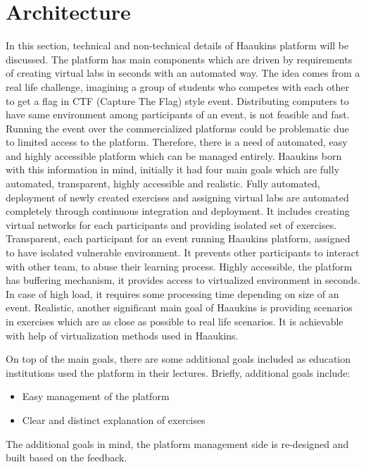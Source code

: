 \chapter{Architecture}\label{chapter:}

In this section, technical and non-technical details of Haaukins platform will be discussed. The platform has main components which are driven by requirements of creating virtual labs in seconds with an automated way.  The idea comes from a real life challenge, imagining a group of students who competes with each other to get a flag in CTF (Capture The Flag) style event. Distributing computers to have same environment among participants of an event, is not feasible and fast. Running the event over the commercialized platforms could be problematic due to limited access to the platform. Therefore, there is a need of automated, easy and highly accessible platform which can be managed entirely. Haaukins born with this information in mind, initially it had four main goals which are fully automated, transparent, highly accessible and realistic\cite{8820918}. 
Fully automated, deployment of newly created exercises and assigning virtual labs are automated completely through continuous integration and deployment. It includes creating virtual networks for each participants and providing isolated set of exercises. 
Transparent, each participant for an event running Haaukins platform, assigned to have isolated vulnerable environment. It prevents other participants to interact with other team, to abuse their learning process. 
Highly accessible, the platform has buffering mechanism, it provides access to virtualized environment in seconds. In case of high load, it requires some processing time depending on size of an event. 
Realistic, another significant main goal of Haaukins is providing scenarios in exercises which are as close as possible to real life scenarios. It is achievable with help of virtualization methods used in Haaukins. 

On top of the main goals, there are some additional goals included as education institutions used the platform in their lectures. Briefly, additional goals include: 
\begin{itemize}
    \item Easy management of the platform
    \item Clear and distinct explanation of exercises 
\end{itemize}

The additional goals in mind, the platform management side is re-designed and built based on the feedback. 

